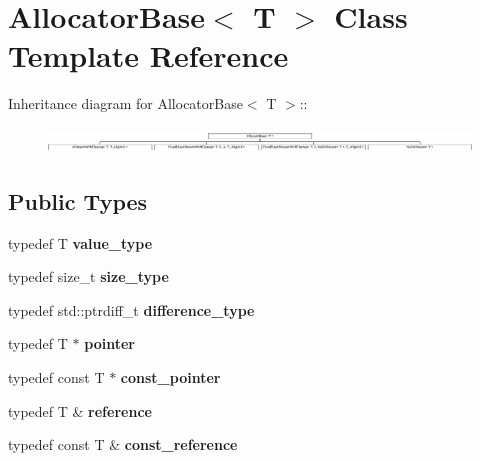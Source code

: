 \hypertarget{class_allocator_base}{
\section{AllocatorBase$<$ T $>$ Class Template Reference}
\label{class_allocator_base}
}
Inheritance diagram for AllocatorBase$<$ T $>$::\begin{figure}[H]
\begin{center}
\leavevmode
\includegraphics[height=0.660377cm]{class_allocator_base}
\end{center}
\end{figure}
\subsection*{Public Types}
\begin{DoxyCompactItemize}
\item 
\hypertarget{class_allocator_base_a461f6d214f73761bb656a76db8f608c0}{
typedef T {\bfseries value\_\-type}}
\label{class_allocator_base_a461f6d214f73761bb656a76db8f608c0}

\item 
\hypertarget{class_allocator_base_adda200f657efdba2d08e80ee9a7f244d}{
typedef size\_\-t {\bfseries size\_\-type}}
\label{class_allocator_base_adda200f657efdba2d08e80ee9a7f244d}

\item 
\hypertarget{class_allocator_base_a10c1b15630e208c28183b72debcff98c}{
typedef std::ptrdiff\_\-t {\bfseries difference\_\-type}}
\label{class_allocator_base_a10c1b15630e208c28183b72debcff98c}

\item 
\hypertarget{class_allocator_base_a719f87a9b5da234dbc8c8c1c88be253c}{
typedef T $\ast$ {\bfseries pointer}}
\label{class_allocator_base_a719f87a9b5da234dbc8c8c1c88be253c}

\item 
\hypertarget{class_allocator_base_a3ac778a475e77ea22ff8e7bea2aa983e}{
typedef const T $\ast$ {\bfseries const\_\-pointer}}
\label{class_allocator_base_a3ac778a475e77ea22ff8e7bea2aa983e}

\item 
\hypertarget{class_allocator_base_a151889fd23094bf841959ab226708f83}{
typedef T \& {\bfseries reference}}
\label{class_allocator_base_a151889fd23094bf841959ab226708f83}

\item 
\hypertarget{class_allocator_base_a3ad08c82939fd8b18621a1d870a0d10e}{
typedef const T \& {\bfseries const\_\-reference}}
\label{class_allocator_base_a3ad08c82939fd8b18621a1d870a0d10e}

\end{DoxyCompactItemize}
